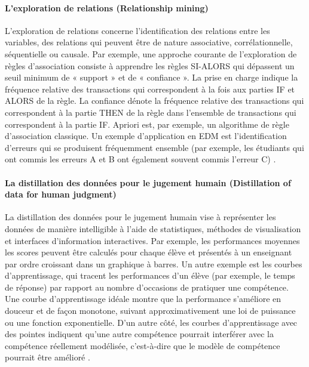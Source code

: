     \paragraph{L'exploration de relations (Relationship mining)}
    L'exploration de relations concerne l'identification des relations entre les variables, des relations qui peuvent être de nature associative, corrélationnelle, séquentielle ou causale. Par exemple, une approche courante de l'exploration de règles d'association consiste à apprendre les règles SI-ALORS qui dépassent un seuil minimum de « support » et de « confiance ». La prise en charge indique la fréquence relative des transactions qui correspondent à la fois aux parties IF et ALORS de la règle. La confiance dénote la fréquence relative des transactions qui correspondent à la partie THEN de la règle dans l'ensemble de transactions qui correspondent à la partie IF. Apriori est, par exemple, un algorithme de règle d'association classique. Un exemple d'application en EDM est l'identification d'erreurs qui se produisent fréquemment ensemble (par exemple, les étudiants qui ont commis les erreurs A et B ont également souvent commis l'erreur C) \cite{Scheuer2012}.
    
    \paragraph{La distillation des données pour le jugement humain (Distillation of data for human judgment)}
    La distillation des données pour le jugement humain vise à représenter les données de manière intelligible à l'aide de statistiques, méthodes de visualisation et interfaces d'information interactives. Par exemple, les performances moyennes les scores peuvent être calculés pour chaque élève et présentés à un enseignant par ordre croissant dans un graphique à barres. Un autre exemple est les courbes d'apprentissage, qui tracent les performances d'un élève (par exemple, le temps de réponse) par rapport au nombre d'occasions de pratiquer une compétence. Une courbe d'apprentissage idéale montre que la performance s'améliore en douceur et de façon monotone, suivant approximativement une loi de puissance ou une fonction exponentielle. D'un autre côté, les courbes d'apprentissage avec des pointes indiquent qu'une autre compétence pourrait interférer avec la compétence réellement modélisée, c'est-à-dire que le modèle de compétence pourrait être amélioré \cite{Scheuer2012}.
    
